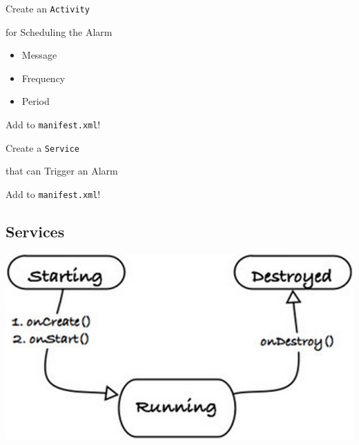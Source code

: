 \documentclass[a4paper,slides=slides,handouts=handouts]{mh-presentation}       %
\begin{document}
	\begin{slide}
		{\Huge Create an \verb~Activity~}
		
		\vspace{3mm}
		
		{\Huge for Scheduling the Alarm}
		
		\pause
		
		\vspace{5mm}
		
		\Huge
		\begin{minipage}{5cm}
			\begin{itemize}
			  \item Message \pause
			  \item Frequency \pause
			  \item Period
			\end{itemize}
		\end{minipage}
		
		\pause
		
		\vspace{5mm}
		
		{\Huge Add to \verb~manifest.xml~!}
	\end{slide}
	
	\begin{slide}
		{\Huge Create a \verb~Service~}
		
		\vspace{3mm}
		
		{\Huge that can Trigger an Alarm}
		
		\pause
		
		\vspace{1cm}
		
		{\Huge Add to \verb~manifest.xml~!}
	\end{slide}
	
	\showPreviousSlide[5]\showThisSlide[2]

\subsection{Services}%
	
	\begin{slide}
		\includegraphics[scale=.3]{servicelifecycle.png}
	\end{slide}
	
\end{document}
